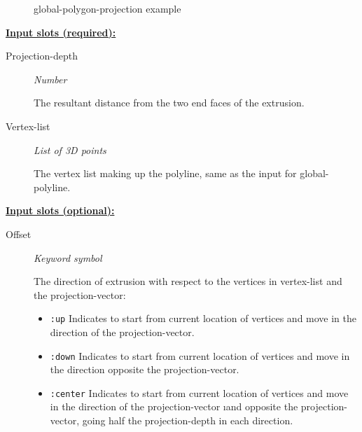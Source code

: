 \documentclass [11pt]{book}
\begin{document}
\begin{itemize}
\begin{figure}
\caption{global-polygon-projection example}

\label{fig:global-polygon-projection}

\end{figure}





\textbf{
\underline{Input slots (required):}}

\begin{description}

\item [Projection-depth]
\emph{Number}

 The resultant distance from the two end faces of the extrusion.




\item [Vertex-list]
\emph{List of 3D points}

 The vertex list making up the polyline, same as the input for global-polyline.




\end{description}






\textbf{
\underline{Input slots (optional):}}

\begin{description}

\item [Offset]
\emph{Keyword symbol}

 The direction of extrusion with respect to the vertices in vertex-list and the projection-vector:


\begin{itemize}

\item \texttt{:up} Indicates to start from current location of vertices and move in the direction of
the projection-vector.


\item \texttt{:down} Indicates to start from current location of vertices and move in the direction opposite
the projection-vector.


\item \texttt{:center} Indicates to start from current location of vertices and move in the direction of
the projection-vector 
\i{and} opposite the projection-vector, going half the projection-depth in
each direction.



\end{itemize}
\end{description}
\end{itemize}
\end{document}
